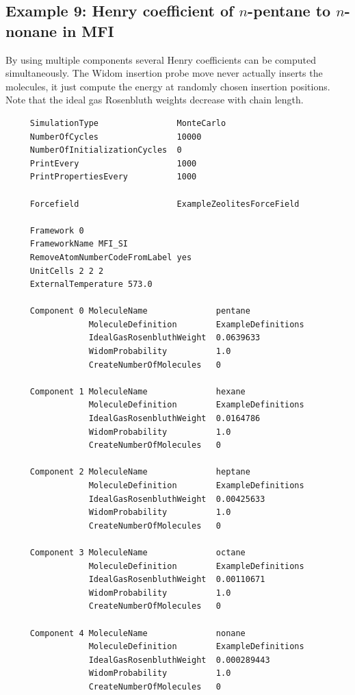 \subsection*{Example 9: Henry coefficient of $n$-pentane to $n$-nonane in MFI}

By using multiple components several Henry coefficients can be computed simultaneously. The Widom insertion probe move
never actually inserts the molecules, it just compute the energy at randomly chosen insertion positions.
Note that the ideal gas Rosenbluth weights decrease with chain length.

\begin{tiny}
\begin{verbatim}
     SimulationType                MonteCarlo
     NumberOfCycles                10000
     NumberOfInitializationCycles  0
     PrintEvery                    1000
     PrintPropertiesEvery          1000
     
     Forcefield                    ExampleZeolitesForceField
     
     Framework 0
     FrameworkName MFI_SI
     RemoveAtomNumberCodeFromLabel yes
     UnitCells 2 2 2
     ExternalTemperature 573.0
     
     Component 0 MoleculeName              pentane
                 MoleculeDefinition        ExampleDefinitions
                 IdealGasRosenbluthWeight  0.0639633
                 WidomProbability          1.0
                 CreateNumberOfMolecules   0
    
     Component 1 MoleculeName              hexane
                 MoleculeDefinition        ExampleDefinitions
                 IdealGasRosenbluthWeight  0.0164786
                 WidomProbability          1.0
                 CreateNumberOfMolecules   0
     
     Component 2 MoleculeName              heptane
                 MoleculeDefinition        ExampleDefinitions
                 IdealGasRosenbluthWeight  0.00425633
                 WidomProbability          1.0
                 CreateNumberOfMolecules   0
     
     Component 3 MoleculeName              octane
                 MoleculeDefinition        ExampleDefinitions
                 IdealGasRosenbluthWeight  0.00110671
                 WidomProbability          1.0
                 CreateNumberOfMolecules   0
     
     Component 4 MoleculeName              nonane
                 MoleculeDefinition        ExampleDefinitions
                 IdealGasRosenbluthWeight  0.000289443
                 WidomProbability          1.0
                 CreateNumberOfMolecules   0
\end{verbatim}
\end{tiny}

